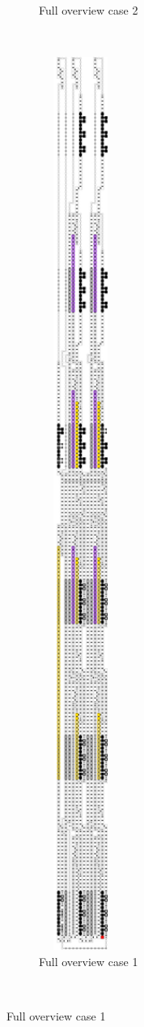 \begin{figure}[H]
\begin{subfigure}[t]{0.3\textwidth}
        \caption{\label{fig:full_overview_case2_colored} Full overview case 2}
    \end{subfigure}%
    ~
    \begin{subfigure}[t]{0.3\textwidth}
        \centering
        \includegraphics[width=0.3\textwidth]{full_overview_case_1_colored}
        \caption{\label{fig:full_overview_case1_colored} Full overview case 1}
    \end{subfigure}%
    ~
\end{figure}